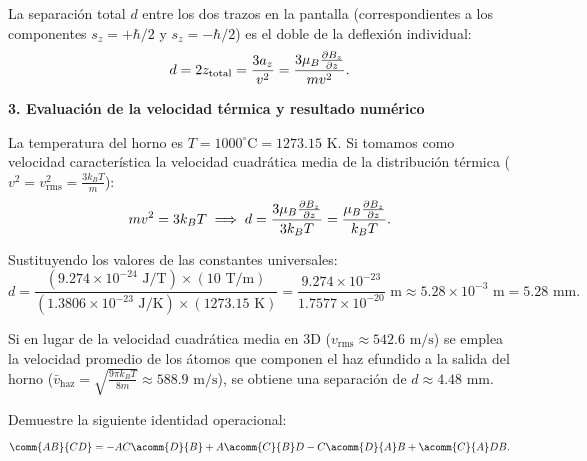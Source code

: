 \begin{resolucion}
La separación total $d$ entre los dos trazos en la pantalla (correspondientes a los componentes $s_z = +\hbar/2$ y $s_z = -\hbar/2$) es el doble de la deflexión individual:
\[
d = 2 z_{\text{total}} = \frac{3 a_z}{v^2} = \frac{3 \mu_B \frac{\partial B_z}{\partial z}}{m v^2}.
\]

\textbf{3. Evaluación de la velocidad térmica y resultado numérico}

La temperatura del horno es $T = 1000^\circ\text{C} = 1273.15\text{ K}$. Si tomamos como velocidad característica la velocidad cuadrática media de la distribución térmica ($v^2 = v_{\text{rms}}^2 = \frac{3 k_B T}{m}$):
\[
m v^2 = 3 k_B T \implies d = \frac{3 \mu_B \frac{\partial B_z}{\partial z}}{3 k_B T} = \frac{\mu_B \frac{\partial B_z}{\partial z}}{k_B T}.
\]

Sustituyendo los valores de las constantes universales:
\[
d = \frac{(9.274 \times 10^{-24}\text{ J/T}) \times (10\text{ T/m})}{(1.3806 \times 10^{-23}\text{ J/K}) \times (1273.15\text{ K})} = \frac{9.274 \times 10^{-23}}{1.7577 \times 10^{-20}}\text{ m} \approx 5.28 \times 10^{-3}\text{ m} = 5.28\text{ mm}.
\]

\begin{nota}
Si en lugar de la velocidad cuadrática media en 3D ($v_{\text{rms}} \approx 542.6\text{ m/s}$) se emplea la velocidad promedio de los átomos que componen el haz efundido a la salida del horno ($\bar{v}_{\text{haz}} = \sqrt{\frac{9\pi k_B T}{8m}} \approx 588.9\text{ m/s}$), se obtiene una separación de $d \approx 4.48\text{ mm}$.
\end{nota}
\end{resolucion}
\begin{enunciado}
Demuestre la siguiente identidad operacional:
\[
\comm{AB}{CD} = -AC \acomm{D}{B} + A \acomm{C}{B} D - C \acomm{D}{A} B + \acomm{C}{A} DB.
\]
\end{enunciado}

